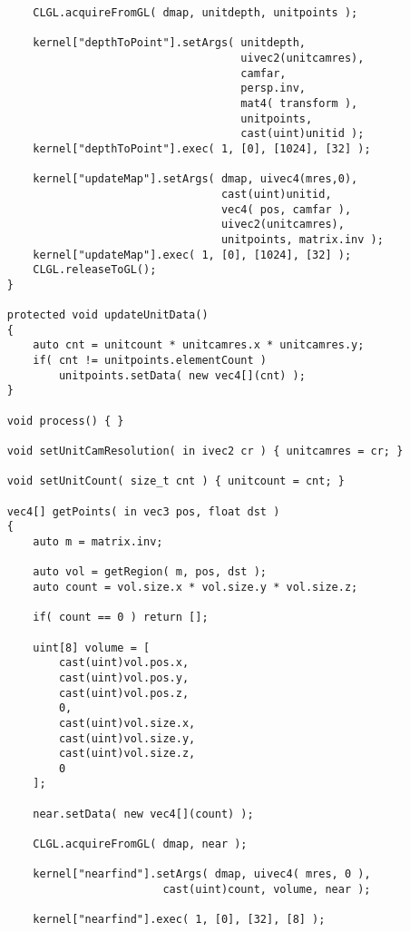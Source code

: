 \begin{verbatim}
        CLGL.acquireFromGL( dmap, unitdepth, unitpoints );

        kernel["depthToPoint"].setArgs( unitdepth,
                                        uivec2(unitcamres),
                                        camfar,
                                        persp.inv,
                                        mat4( transform ),
                                        unitpoints,
                                        cast(uint)unitid );
        kernel["depthToPoint"].exec( 1, [0], [1024], [32] );

        kernel["updateMap"].setArgs( dmap, uivec4(mres,0),
                                     cast(uint)unitid,
                                     vec4( pos, camfar ),
                                     uivec2(unitcamres),
                                     unitpoints, matrix.inv );
        kernel["updateMap"].exec( 1, [0], [1024], [32] );
        CLGL.releaseToGL();
    }

    protected void updateUnitData()
    {
        auto cnt = unitcount * unitcamres.x * unitcamres.y;
        if( cnt != unitpoints.elementCount )
            unitpoints.setData( new vec4[](cnt) );
    }

    void process() { }

    void setUnitCamResolution( in ivec2 cr ) { unitcamres = cr; }

    void setUnitCount( size_t cnt ) { unitcount = cnt; }

    vec4[] getPoints( in vec3 pos, float dst )
    {
        auto m = matrix.inv;

        auto vol = getRegion( m, pos, dst );
        auto count = vol.size.x * vol.size.y * vol.size.z;

        if( count == 0 ) return [];

        uint[8] volume = [
            cast(uint)vol.pos.x,
            cast(uint)vol.pos.y,
            cast(uint)vol.pos.z,
            0,
            cast(uint)vol.size.x,
            cast(uint)vol.size.y,
            cast(uint)vol.size.z,
            0
        ];

        near.setData( new vec4[](count) );

        CLGL.acquireFromGL( dmap, near );

        kernel["nearfind"].setArgs( dmap, uivec4( mres, 0 ),
                            cast(uint)count, volume, near );

        kernel["nearfind"].exec( 1, [0], [32], [8] );


\end{verbatim}
